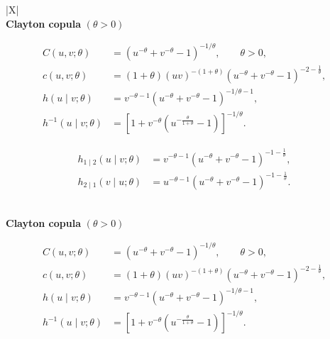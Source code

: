 \documentclass[12pt,oneside,a4paper]{book}
\theoremstyle{definition}
\theoremstyle{remark}
\begin{document}
\begin{table}[H]
\begin{tabularx}{\textwidth}{|X|}
			\\
			\hline
			\textbf{Clayton copula}
			$\left(\theta>0\right)$
			\\
			\hline

			\[
			\begin{aligned}
				C(u,v;\theta)
				&=
				\left(
				u^{-\theta}+v^{-\theta}-1
				\right)^{-1/\theta},
				\qquad \theta>0,
				\\[4pt]
				c(u,v;\theta)
				&=
				(1+\theta)
				(uv)^{-(1+\theta)}
				\left(
				u^{-\theta}+v^{-\theta}-1
				\right)^{-2-\frac{1}{\theta}},
				\\[4pt]
				h(u\mid v;\theta)
				&=
				v^{-\theta-1}
				\left(
				u^{-\theta}+v^{-\theta}-1
				\right)^{-1/\theta-1},
				\\[4pt]
				h^{-1}(u\mid v;\theta)
				&=
				\left[
				1+
				v^{-\theta}
				\left(
				u^{-\frac{\theta}{1+\theta}}-1
				\right)
				\right]^{-1/\theta}.
			\end{aligned}
			\]

			\[
			\begin{aligned}
				h_{1\mid2}(u\mid v;\theta)
				&=
				v^{-\theta-1}
				\left(
				u^{-\theta}+v^{-\theta}-1
				\right)^{-1-\frac{1}{\theta}},
				\\[4pt]
				h_{2\mid1}(v\mid u;\theta)
				&=
				u^{-\theta-1}
				\left(
				u^{-\theta}+v^{-\theta}-1
				\right)^{-1-\frac{1}{\theta}}.
			\end{aligned}
			\]


			\\
			\hline
			\textbf{Clayton copula}
			$\left(\theta>0\right)$
			\\
			\hline

			\[
			\begin{aligned}
				C(u,v;\theta)
				&=
				\left(
				u^{-\theta}+v^{-\theta}-1
				\right)^{-1/\theta},
				\qquad \theta>0,
				\\[4pt]
				c(u,v;\theta)
				&=
				(1+\theta)
				(uv)^{-(1+\theta)}
				\left(
				u^{-\theta}+v^{-\theta}-1
				\right)^{-2-\frac{1}{\theta}},
				\\[4pt]
				h(u\mid v;\theta)
				&=
				v^{-\theta-1}
				\left(
				u^{-\theta}+v^{-\theta}-1
				\right)^{-1/\theta-1},
				\\[4pt]
				h^{-1}(u\mid v;\theta)
				&=
				\left[
				1+
				v^{-\theta}
				\left(
				u^{-\frac{\theta}{1+\theta}}-1
				\right)
				\right]^{-1/\theta}.
			\end{aligned}
			\]


\end{tabularx}
\end{table}
\end{document}
